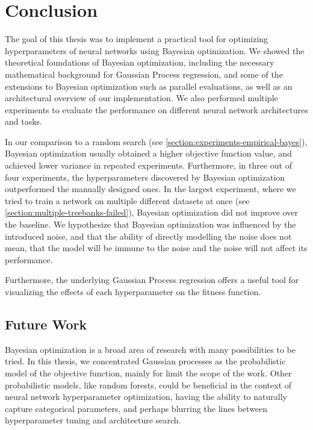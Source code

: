 \chapter{Conclusion}

The goal of this thesis was to implement a practical tool for optimizing hyperparameters of neural networks using Bayesian optimization. We showed the theoretical foundations of Bayesian optimization, including the necessary mathematical background for Gaussian Process regression, and some of the extensions to Bayesian optimization such as parallel evaluations, as well as an architectural overview of our implementation. We also performed multiple experiments to evaluate the performance on different neural network architectures and tasks.

In our comparison to a random search (see \autoref{section:experiments-empirical-bayes}), Bayesian optimization usually obtained a higher objective function value, and achieved lower variance in repeated experiments. Furthermore, in three out of four experiments, the hyperparameters discovered by Bayesian optimization outperformed the manually designed ones. In the largest experiment, where we tried to train a network on multiple different datasets at once (see \autoref{section:multiple-treebanks-failed}), Bayesian optimization did not improve over the baseline. We hypothesize that Bayesian optimization was influenced by the introduced noise, and that the ability of directly modelling the noise does not mean, that the model will be immune to the noise and the noise will not affect its performance.

Furthermore, the underlying Gaussian Process regression offers a useful tool for visualizing the effects of each hyperparameter on the fitness function.




\section{Future Work}

Bayesian optimization is a broad area of research with many possibilities to be tried. In this thesis, we concentrated Gaussian processes as the probabilistic model of the objective function, mainly for limit the scope of the work. Other probabilistic models, like random forests, could be beneficial in the context of neural network hyperparameter optimization, having the ability to naturally capture categorical parameters, and perhaps blurring the lines between hyperparameter tuning and architecture search.

